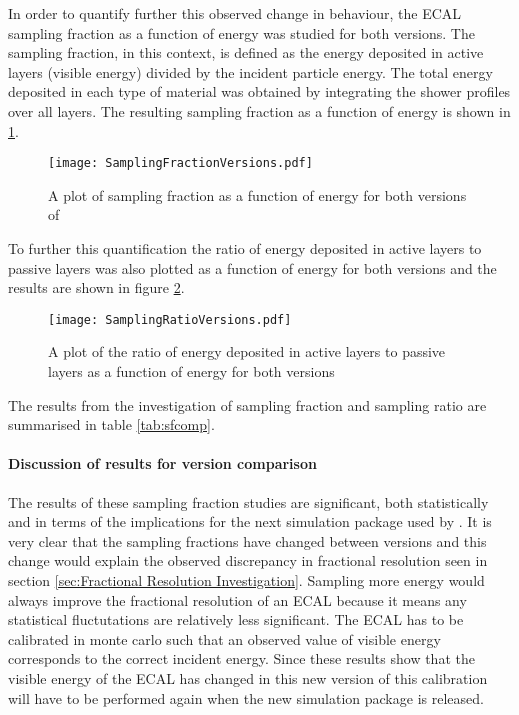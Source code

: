 In order to quantify further this observed change in behaviour, the ECAL sampling fraction as a function of energy was studied for both \geant versions.  The sampling fraction, in this context, is defined as the energy deposited in active layers (visible energy) divided by the incident particle energy.  The total energy deposited in each type of material was obtained by integrating the shower profiles over all layers.  The resulting sampling fraction as a function of energy is shown in \ref{fig:sfcomp}.
\begin{figure}[h]
  \centering
  \texttt{[image: SamplingFractionVersions.pdf]}
  \caption{A plot of sampling fraction as a function of energy for both versions of \geant}
  \label{fig:sfcomp}
\end{figure}
To further this quantification the ratio of energy deposited in active layers to passive layers was also plotted as a function of energy for both \geant versions and the results are shown in figure \ref{fig:ratiocomp}.
\begin{figure}[h]
  \centering
  \texttt{[image: SamplingRatioVersions.pdf]}
  \caption{A plot of the ratio of energy deposited in active layers to passive layers as a function of energy for both \geant versions}
  \label{fig:ratiocomp}
\end{figure}
The results from the investigation of sampling fraction and sampling ratio are summarised in table \ref{tab:sfcomp}.

\paragraph{Discussion of results for \geant version comparison}
\label{sec:Discussionofresultsone}
The results of these sampling fraction studies are significant, both statistically and in terms of the implications for the next simulation package used by \lhcb.  It is very clear that the sampling fractions have changed between \geant versions and this change would explain the observed discrepancy in fractional resolution seen in section \ref{sec:Fractional Resolution Investigation}.  Sampling more energy would always improve the fractional resolution of an ECAL because it means any statistical fluctutations are relatively less significant. The ECAL has to be calibrated in monte carlo such that an observed value of visible energy corresponds to the correct incident energy.  Since these results show that the visible energy of the ECAL has changed in this new version of \geant this calibration will have to be performed again when the new simulation package is released.

